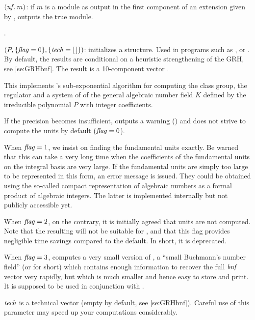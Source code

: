 $(\hbox{\it nf\/},m)$: if $m$ is a module as output in the
first component of an extension given by , outputs the
true module.

.

$(P,\{\hbox{\it f\kern0pt lag\/}=0\},\{\hbox{\it tech\/}=[\,]\})$: initializes a
 structure. Used in programs such as ,
 or . By default, the results are conditional
on a heuristic strengthening of the GRH, see \ref{se:GRHbnf}. The result is a
10-component vector .

This implements 's sub-exponential algorithm for computing the
class group, the regulator and a system of  of the
general algebraic number field $K$ defined by the irreducible polynomial $P$
with integer coefficients.

If the precision becomes insufficient,  outputs a warning
() and does not strive to compute
the units by default ($\hbox{\it f\kern0pt lag\/}=0$).

   When $\hbox{\it f\kern0pt lag\/}=1$, we insist on finding the fundamental units exactly. Be
warned that this can take a very long time when the coefficients of the
fundamental units on the integral basis are very large. If the fundamental
units are simply too large to be represented in this form, an error message
is issued. They could be obtained using the so-called compact representation
of algebraic numbers as a formal product of algebraic integers. The latter is
implemented internally but not publicly accessible yet.

   When $\hbox{\it f\kern0pt lag\/}=2$, on the contrary, it is initially agreed that units are not
computed. Note that the resulting  will not be suitable for
, and that this flag provides negligible time savings
compared to the default. In short, it is deprecated.

   When $\hbox{\it f\kern0pt lag\/}=3$, computes a very small version of , a ``small
Buchmann's number field'' (or  for short) which contains enough
information to recover the full $\hbox{\it bnf\/}$ vector very rapidly, but which is
much smaller and hence easy to store and print. It is supposed to be used in
conjunction with .

$\hbox{\it tech\/}$ is a technical vector (empty by default, see \ref{se:GRHbnf}).
Careful use of this parameter may speed up your computations considerably.

\smallskip

